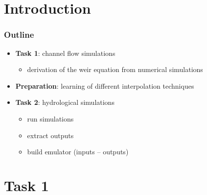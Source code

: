 \documentclass[xcolor=dvipsnames, USenglish]{beamer}  %
\begin{document}
\section{Introduction}

  \begin{frame}
    \frametitle{Outline}
    \begin{itemize}
      \item \textbf{Task 1}: channel flow simulations
        \begin{itemize}
          \item derivation of the weir equation from numerical simulations
        \end{itemize}
      \item \textbf{Preparation}: learning of different interpolation techniques
      \item \textbf{Task 2}: hydrological simulations
        \begin{itemize}
          \item run simulations
          \item extract outputs
          \item build emulator (inputs -- outputs)
        \end{itemize}
     \end{itemize}
  \end{frame}


\section{Task 1}
\end{document}
